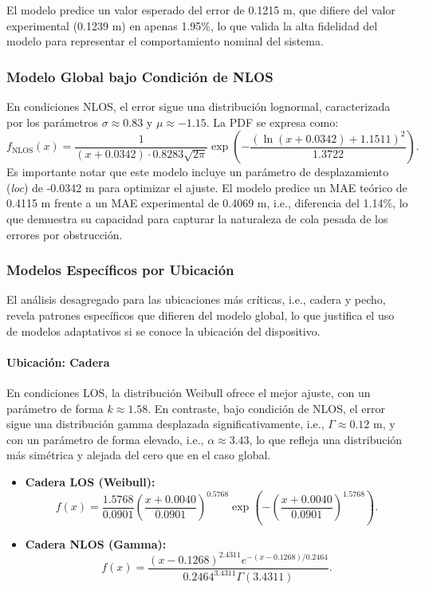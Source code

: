 El modelo predice un valor esperado del error de 0.1215 m, que difiere del valor experimental (0.1239 m) en apenas 1.95\%, lo que valida la alta fidelidad del modelo para representar el comportamiento nominal del sistema.

\subsubsection{Modelo Global bajo Condición de NLOS}

En condiciones NLOS, el error sigue una distribución lognormal, caracterizada por los parámetros $\sigma \approx 0.83$ y $\mu \approx -1.15$. La PDF se expresa como:
%
\begin{equation}
f_{\textrm{NLOS}}(x) = \frac{1}{(x + 0.0342) \cdot 0.8283 \sqrt{2\pi}} \exp\left(-\frac{(\ln(x + 0.0342) + 1.1511)^2}{1.3722}\right).
\end{equation}
%
Es importante notar que este modelo incluye un parámetro de desplazamiento (\textit{loc}) de -0.0342 m para optimizar el ajuste. El modelo predice un MAE teórico de 0.4115 m frente a un MAE experimental de 0.4069 m, i.e., diferencia del 1.14\%, lo que demuestra su capacidad para capturar la naturaleza de cola pesada de los errores por obstrucción.

\subsubsection{Modelos Específicos por Ubicación}

El análisis desagregado para las ubicaciones más críticas, i.e., cadera y pecho, revela patrones específicos que difieren del modelo global, lo que justifica el uso de modelos adaptativos si se conoce la ubicación del dispositivo.

\paragraph{Ubicación: Cadera}
En condiciones LOS, la distribución Weibull ofrece el mejor ajuste, con un parámetro de forma $k \approx 1.58$. En contraste, bajo condición de NLOS, el error sigue una distribución gamma desplazada significativamente, i.e., $\Gamma \approx 0.12$ m, y con un parámetro de forma elevado, i.e., $\alpha \approx 3.43$, lo que refleja una distribución más simétrica y alejada del cero que en el caso global.
%
\begin{itemize}
    \item \textbf{Cadera LOS (Weibull):}
    \begin{equation}
    f(x) = \frac{1.5768}{0.0901} \left(\frac{x + 0.0040}{0.0901}\right)^{0.5768} \exp\left(-\left(\frac{x + 0.0040}{0.0901}\right)^{1.5768}\right).
    \end{equation}
    \item \textbf{Cadera NLOS (Gamma):}
    \begin{equation}
    f(x) = \frac{(x - 0.1268)^{2.4311} e^{-(x - 0.1268)/0.2464}}{0.2464^{3.4311} \Gamma(3.4311)}.
    \end{equation}
\end{itemize}


